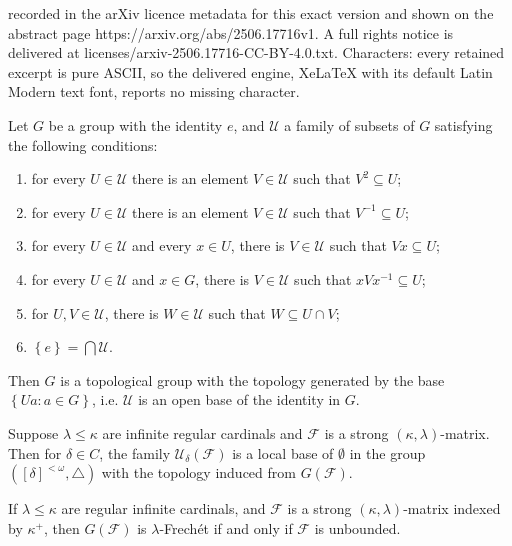 \documentclass[10pt,a4paper]{amsart}
\newcommand{\cu}{\mathcal U}
\newcommand{\ps}{\emptyset}
\newcommand{\set}[1]{\left\{#1\right\}}
\newcommand{\sst}{\subseteq}
\renewcommand{\d}{\delta}
\renewcommand{\k}{\kappa}
\renewcommand{\l}{\lambda}
\renewcommand{\o}{\omega}
\begin{document}
recorded in the arXiv licence metadata for this exact version and shown on the abstract page https://arxiv.org/abs/2506.17716v1. A full rights notice is delivered at licenses/arxiv-2506.17716-CC-BY-4.0.txt. Characters: every retained excerpt is pure ASCII, so the delivered engine, XeLaTeX with its default Latin Modern text font, reports no missing character.
\begin{theorem}\label{t:osnovna}
	Let $G$ be a group with the identity $e$, and $\cu$ a family of subsets of $G$ satisfying the following conditions:
	\begin{enumerate}
		\item for every $U\in\cu$ there is an element $V\in\cu$ such that $V^2\sst U$;
		\item for every $U\in\cu$ there is an element $V\in\cu$ such that $V^{-1}\sst U$;
		\item for every $U\in\cu$ and every $x\in U$, there is $V\in\cu$ such that $Vx\sst U$;
		\item for every $U\in\cu$ and $x\in G$, there is $V\in\cu$ such that $xVx^{-1}\sst U$;
		\item for $U,V\in\cu$, there is $W\in\cu$ such that $W\sst U\cap V$;
		\item $\set{e}=\bigcap \cu$.
	\end{enumerate}
	Then $G$ is a topological group with the topology generated by the base $\set{Ua:a\in G}$, i.e. $\cu$ is an open base of the identity in $G$.
\end{theorem}

\begin{theorem}\label{t:smallcharacter}
    Suppose $\l\le\k$ are infinite regular cardinals and $\mathcal F$ is a strong $(\k,\l)$-matrix.
	Then for $\d\in C$, the family $\cu_{\d}(\mathcal F)$ is a local base of $\ps$ in the group $([\d]^{<\o}, \triangle)$ with the topology induced from $G(\mathcal F)$.
\end{theorem}

\begin{theorem}\label{t:frechet}
	If $\l\le\k$ are regular infinite cardinals, and $\mathcal F$ is a strong $(\k,\l)$-matrix indexed by $\k^+$, then 
	$G(\mathcal F)$ is $\l$-Frech\'et if and only if $\mathcal F$ is unbounded.
\end{theorem}
\end{document}
